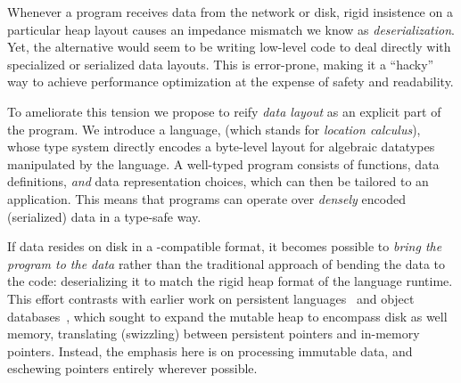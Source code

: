 \documentclass[showabstract,showacknowledgments,showpreface,showdedication]{iuphd}
\theoremstyle{nonumberplain}
\begin{document}
Whenever a program receives data from the network or disk, rigid
insistence on a particular heap layout causes an impedance mismatch we know as
{\em deserialization}.
%
%
Yet, the alternative would seem to be writing low-level code to deal directly
with specialized or serialized data layouts.  This is error-prone, making it a
``hacky'' way to achieve performance optimization at the expense of safety and
readability.

To ameliorate this tension we propose to reify {\em data layout} as an explicit
part of the program.  We introduce a language, \ourcalc (which stands for {\em location
  calculus}), whose type system directly encodes a byte-level
layout for algebraic datatypes manipulated by the language.
%
A well-typed program consists of functions, data definitions, {\em and} 
data representation choices, which
can then be tailored to an application.
%
This means that programs can operate over {\em densely}
encoded (serialized) data in a type-safe way.
%

{If data resides on disk in a \ourcalc-compatible format}, it becomes
possible to {\em bring the program to the data} rather than the traditional
approach of bending the data to the code: deserializing it to match the rigid
heap format of the language runtime.
{This effort contrasts with earlier work on persistent
languages~\cite{persistent-java,persistent-objects-thor} and object databases~\cite{object-fault-handling},
which sought to expand the mutable heap to encompass disk as well memory,
translating (swizzling) between persistent pointers and in-memory pointers.  Instead, the
emphasis here is on processing immutable data, and eschewing pointers entirely
wherever possible.}

\end{document}
